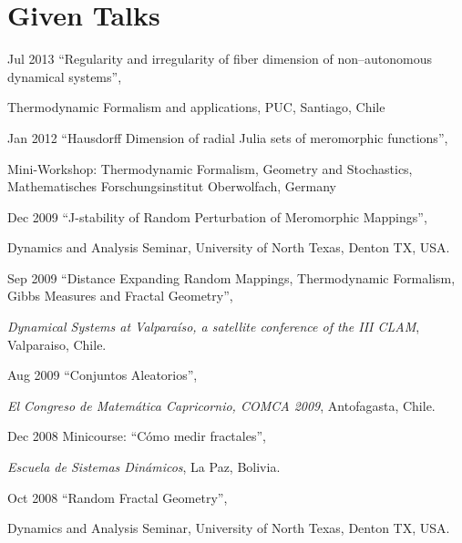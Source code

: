 \documentclass{article}
\begin{document}
\section{Given Talks}

\begin{CV}

\item[Jul 2013] ``Regularity and irregularity of fiber dimension of non--auto\-nomous dynamical systems'', 

  Thermodynamic Formalism and applications, %
  PUC, Santiago, Chile

\item[Jan 2012] ``Hausdorff Dimension of radial Julia sets of meromorphic functions'',

  Mini-Workshop: Thermodynamic Formalism, Geometry and Stochastics,
  Mathematisches Forschungsinstitut Oberwolfach, Germany


\item[Dec 2009] ``J-stability of Random Perturbation of Meromorphic
  Mappings'',

  Dynamics and Analysis Seminar, University of North Texas, Denton TX,
  USA.

\item[Sep 2009] ``Distance Expanding Random Mappings, Thermodynamic
  Formalism, Gibbs Measures and Fractal Geometry'', 

  {\em Dynamical
    Systems at Valparaíso, a satellite conference of the III CLAM},
  Valparaiso, Chile.

\item[Aug 2009] ``Conjuntos Aleatorios'',

  \emph{El Congreso de Matemática Capricornio, COMCA 2009},
  Anto\-fagasta, Chile.

\item[Dec 2008] Minicourse: ``Cómo medir fractales'', 

  {\em Escuela de Sistemas Dinámicos}, La Paz, Bolivia.


\item[Oct 2008] ``Random Fractal Geometry'', 

  Dynamics and Analysis Seminar, University of North Texas, Denton TX,
  USA.


\end{CV}
\end{document}

